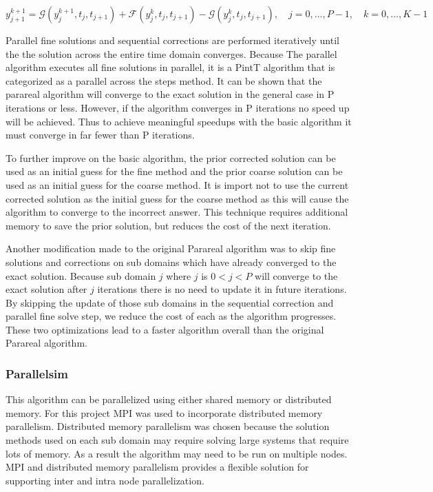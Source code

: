 \documentclass[conf]{new-aiaa}
\begin{document}
\begin{equation}
    y_{j+1}^{k+1}=\mathcal{G}\left(y_{j}^{k+1}, t_{j}, t_{j+1}\right)+\mathcal{F}\left(y_{j}^{k}, t_{j}, t_{j+1}\right)-\mathcal{G}\left(y_{j}^{k}, t_{j}, t_{j+1}\right), \quad j=0, \ldots, P-1, \quad k=0, \ldots, K-1
\end{equation}

Parallel fine solutions and sequential corrections are performed iteratively until the the solution across the entire time domain converges.
Because The parallel algorithm  executes all fine solutions in parallel, it is a PintT algorithm that is categorized as a parallel across the steps method.
It can be shown that the parareal algorithm will converge to the exact solution in the general case in P iterations or less.
However, if the algorithm converges in P iterations no speed up will be achieved.
Thus to achieve meaningful speedups with the basic algorithm it must converge in far fewer than P iterations.



To further improve on the basic algorithm, the prior corrected solution can be used as an initial guess for the fine method and the prior coarse solution can be used as an initial guess for the coarse method.
It is import not to use the current corrected solution as the initial guess for the coarse method as this will cause the algorithm to converge to the incorrect answer.
This technique requires additional memory to save the prior solution, but reduces the cost of the next iteration.

Another modification made to the original Parareal algorithm was to skip fine solutions and corrections on sub domains which have already converged to the exact solution.
Because sub domain $j $ where $j$ is $0 < j < P$ will converge to the exact solution after $j$ iterations there is no need to update it in future iterations.
By skipping the update of those sub domains in the sequential correction and parallel fine solve step, we reduce the cost of each as the algorithm progresses.
These two optimizations lead to a faster algorithm overall than the original Parareal algorithm.



\subsubsection{Parallelsim}
This algorithm can be parallelized using either shared memory or distributed memory.
For this project MPI was used to incorporate distributed memory parallelism.
Distributed memory parallelism was chosen because the solution methods used on each sub domain may require solving large systems that require lots of memory.
As a result the algorithm may need to be run on multiple nodes.
MPI and distributed memory parallelism provides a flexible solution for supporting inter and intra node parallelization.
\end{document}
